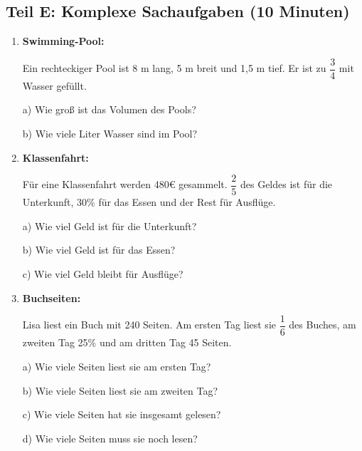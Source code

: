 \subsection*{Teil E: Komplexe Sachaufgaben (10 Minuten)}

\begin{enumerate}[label=\arabic*.]
    \item \textbf{Swimming-Pool:}

    Ein rechteckiger Pool ist 8 m lang, 5 m breit und 1,5 m tief. Er ist zu $\dfrac{3}{4}$ mit Wasser gefüllt.

    a) Wie groß ist das Volumen des Pools? \underline{\hspace{3cm}}

    b) Wie viele Liter Wasser sind im Pool? \underline{\hspace{3cm}}

    \vspace{0.5cm}

    \item \textbf{Klassenfahrt:}

    Für eine Klassenfahrt werden 480€ gesammelt. $\dfrac{2}{5}$ des Geldes ist für die Unterkunft, 30\% für das Essen und der Rest für Ausflüge.

    a) Wie viel Geld ist für die Unterkunft? \underline{\hspace{3cm}}

    b) Wie viel Geld ist für das Essen? \underline{\hspace{3cm}}

    c) Wie viel Geld bleibt für Ausflüge? \underline{\hspace{3cm}}

    \vspace{0.5cm}

    \item \textbf{Buchseiten:}

    Lisa liest ein Buch mit 240 Seiten. Am ersten Tag liest sie $\dfrac{1}{6}$ des Buches, am zweiten Tag 25\% und am dritten Tag 45 Seiten.

    a) Wie viele Seiten liest sie am ersten Tag? \underline{\hspace{3cm}}

    b) Wie viele Seiten liest sie am zweiten Tag? \underline{\hspace{3cm}}

    c) Wie viele Seiten hat sie insgesamt gelesen? \underline{\hspace{3cm}}

    d) Wie viele Seiten muss sie noch lesen? \underline{\hspace{3cm}}

\end{enumerate}